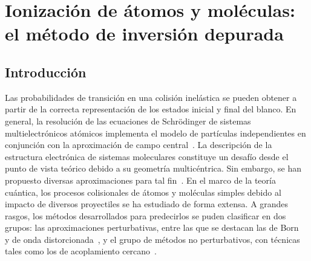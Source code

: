 \chapter{Ionización de átomos y moléculas: el método de inversión depurada}
\label{chap:iondim}

\section{Introducción}

Las probabilidades de transición en una colisión inelástica se pueden 
obtener a partir de la correcta representación de los estados inicial y 
final del blanco. En general, la resolución de las ecuaciones de 
Schr\"odinger de sistemas multielectrónicos atómicos implementa el 
modelo de partículas independientes en conjunción con la aproximación 
de campo central~\cite{Bransden:03,Cowan:81}. La descripción de la 
estructura electrónica de sistemas moleculares constituye un desafío 
desde el punto de vista teórico debido a su geometría multicéntrica. Sin 
embargo, se han propuesto diversas aproximaciones para tal 
fin~\cite{Helgaker:00,Schaefer:04}. 
En el marco de la teoría cuántica, los procesos colisionales de átomos 
y moléculas simples debido al impacto de diversos proyectiles se ha 
estudiado de forma extensa. A grandes rasgos, los métodos desarrollados
para predecirlos se puden clasificar en dos grupos: las aproximaciones 
perturbativas, entre las que se destacan las de Born~\cite{Bates:62,
McDowell:61} y de onda distorcionada~\cite{Crothers:10,Rivarola:87}, y 
el grupo de métodos no perturbativos, con técnicas tales como los de 
acoplamiento cercano~\cite{Pindzola:07,Burke:11,Bray:17,Zatsarinny:04,
McCurdy:04}. 

